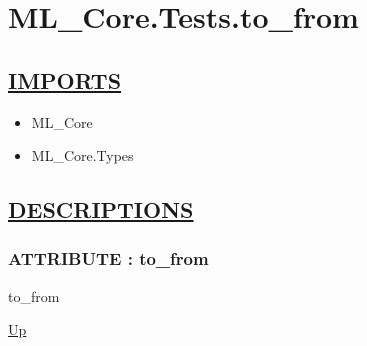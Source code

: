 \chapter*{ML\_Core.Tests.to\_from}
\hypertarget{ecldoc:toc:ML_Core.Tests.to_from}{}

\section*{\underline{IMPORTS}}
\begin{itemize}
\item ML\_Core
\item ML\_Core.Types
\end{itemize}

\section*{\underline{DESCRIPTIONS}}
\subsection*{ATTRIBUTE : to\_from}
\hypertarget{ecldoc:ml_core.tests.to_from}{}
\begin{minipage}[t]{\textwidth}
\begin{flushleft}
 to\_from 
\end{flushleft}
\end{minipage}
\hyperlink{ecldoc:toc:ML_Core/Tests}{Up}

\par
\par
